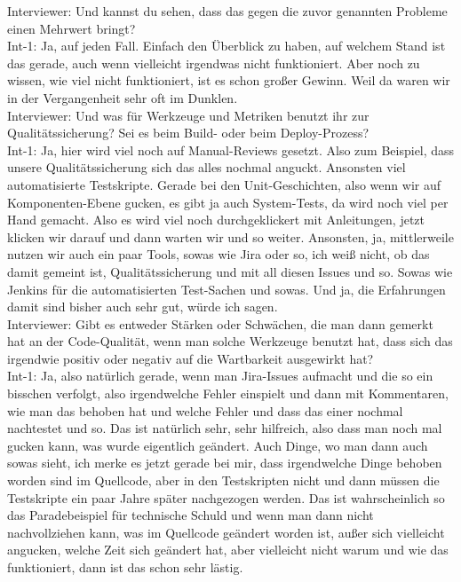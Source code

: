 Interviewer: Und kannst du sehen, dass das gegen die zuvor genannten Probleme einen Mehrwert bringt?\\
Int-1: Ja, auf jeden Fall. Einfach den Überblick zu haben, auf welchem Stand ist das gerade, auch wenn vielleicht irgendwas nicht funktioniert. Aber noch zu wissen, wie viel nicht funktioniert, ist es schon großer Gewinn. Weil da waren wir in der Vergangenheit sehr oft im Dunklen.\\
Interviewer: Und was für Werkzeuge und Metriken benutzt ihr zur Qualitätssicherung? Sei es beim Build- oder beim Deploy-Prozess?\\
Int-1: Ja, hier wird viel noch auf Manual-Reviews gesetzt. Also zum Beispiel, dass unsere Qualitätssicherung sich das alles nochmal anguckt. Ansonsten viel automatisierte Testskripte. Gerade bei den Unit-Geschichten, also wenn wir auf Komponenten-Ebene gucken, es gibt ja auch System-Tests, da wird noch viel per Hand gemacht. Also es wird viel noch durchgeklickert mit Anleitungen, jetzt klicken wir darauf und dann warten wir und so weiter. Ansonsten, ja, mittlerweile nutzen wir auch ein paar Tools, sowas wie Jira oder so, ich weiß nicht, ob das damit gemeint ist, Qualitätssicherung und mit all diesen Issues und so. Sowas wie Jenkins für die automatisierten Test-Sachen und sowas. Und ja, die Erfahrungen damit sind bisher auch sehr gut, würde ich sagen.\\
Interviewer: Gibt es entweder Stärken oder Schwächen, die man dann gemerkt hat an der Code-Qualität, wenn man solche Werkzeuge benutzt hat, dass sich das irgendwie positiv oder negativ auf die Wartbarkeit ausgewirkt hat?\\
Int-1: Ja, also natürlich gerade, wenn man Jira-Issues aufmacht und die so ein bisschen verfolgt, also irgendwelche Fehler einspielt und dann mit Kommentaren, wie man das behoben hat und welche Fehler und dass das einer nochmal nachtestet und so. Das ist natürlich sehr, sehr hilfreich, also dass man noch mal gucken kann, was wurde eigentlich geändert. Auch Dinge, wo man dann auch sowas sieht, ich merke es jetzt gerade bei mir, dass irgendwelche Dinge behoben worden sind im Quellcode, aber in den Testskripten nicht und dann müssen die Testskripte ein paar Jahre später nachgezogen werden. Das ist wahrscheinlich so das Paradebeispiel für technische Schuld und wenn man dann nicht nachvollziehen kann, was im Quellcode geändert worden ist, außer sich vielleicht angucken, welche Zeit sich geändert hat, aber vielleicht nicht warum und wie das funktioniert, dann ist das schon sehr lästig.\\
